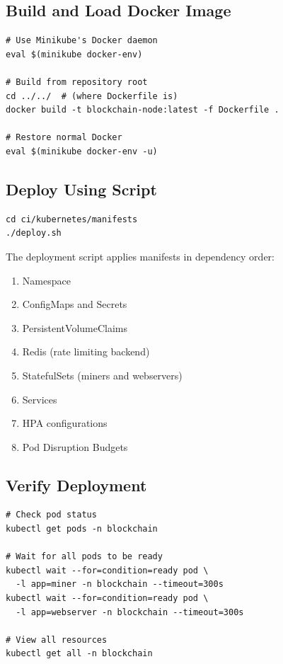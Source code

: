 \subsection{Build and Load Docker Image}

\begin{listing}[H]
\caption{Build Image into Minikube}
\label{lst:ch23-build-image}
\begin{verbatim}
# Use Minikube's Docker daemon
eval $(minikube docker-env)

# Build from repository root
cd ../../  # (where Dockerfile is)
docker build -t blockchain-node:latest -f Dockerfile .

# Restore normal Docker
eval $(minikube docker-env -u)
\end{verbatim}
\end{listing}

\subsection{Deploy Using Script}

\begin{listing}[H]
\caption{Deploy All Kubernetes Resources}
\label{lst:ch23-deploy}
\begin{verbatim}
cd ci/kubernetes/manifests
./deploy.sh
\end{verbatim}
\end{listing}

The deployment script applies manifests in dependency order:
\begin{enumerate}
  \item Namespace
  \item ConfigMaps and Secrets
  \item PersistentVolumeClaims
  \item Redis (rate limiting backend)
  \item StatefulSets (miners and webservers)
  \item Services
  \item HPA configurations
  \item Pod Disruption Budgets
\end{enumerate}

\subsection{Verify Deployment}

\begin{listing}[H]
\caption{Verify Pods Are Running}
\label{lst:ch23-verify}
\begin{verbatim}
# Check pod status
kubectl get pods -n blockchain

# Wait for all pods to be ready
kubectl wait --for=condition=ready pod \
  -l app=miner -n blockchain --timeout=300s
kubectl wait --for=condition=ready pod \
  -l app=webserver -n blockchain --timeout=300s

# View all resources
kubectl get all -n blockchain
\end{verbatim}
\end{listing}

